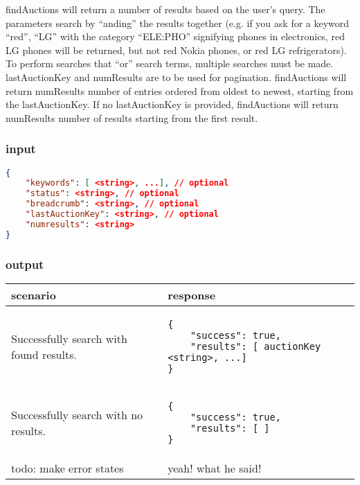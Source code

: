 \documentclass[12pt,a4paper]{article}
\begin{document}
findAuctions will return a number of results based on the user's query. The
parameters search by ``anding'' the results together (e.g. if you ask for a
keyword ``red'', ``LG'' with the category ``ELE:PHO'' signifying phones in
electronics, red LG phones will be returned, but not red Nokia phones, or red
LG refrigerators). To perform searches that ``or'' search terms, multiple
searches must be made. lastAuctionKey and numResults are to be used for
pagination. findAuctions will return numResults number of entries ordered from
oldest to newest, starting from the lastAuctionKey. If no lastAuctionKey is
provided, findAuctions will return numResults number of results starting from
the first result.

\subsubsection{input}
\begin{lstlisting}[language=json,firstnumber=1]
{
    "keywords": [ <string>, ...], // optional
    "status": <string>, // optional
    "breadcrumb": <string>, // optional
    "lastAuctionKey": <string>, // optional
    "numresults": <string>
}
\end{lstlisting}

\subsubsection{output}
\begin{center}
    \begin{tabular}{| p{5cm} | l |}
        \hline
        \textbf{scenario} & \textbf{response} \\
        \hline
        Successfully search with found results. &
        \begin{lstlisting}[boxpos=t,language=tablejson,firstnumber=1]
{
    "success": true,
    "results": [ auctionKey <string>, ...]
}
        \end{lstlisting} \\ 
        \hline
 \hline
        Successfully search with no results. &
        \begin{lstlisting}[boxpos=t,language=tablejson,firstnumber=1]
{
    "success": true,
    "results": [ ]
}
        \end{lstlisting} \\ 
        \hline
            todo: make error states & yeah! what he said! \\
        \hline
    \end{tabular}
\end{center}
\end{document}

